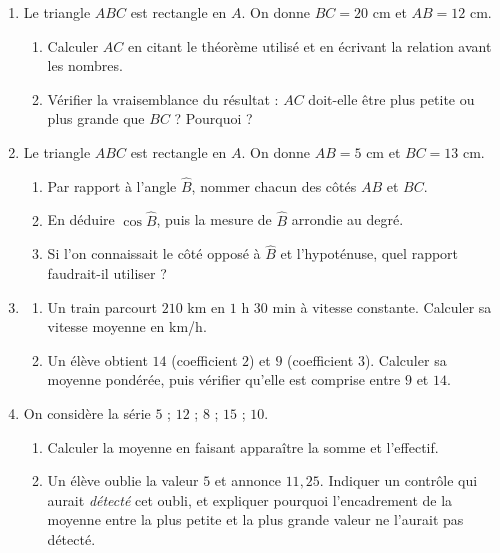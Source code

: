 \documentclass[10pt,a4paper]{article}
\begin{document}
\begin{enumerate}
\needspace{22mm}
\item[\textbf{B1.}] Le triangle $ABC$ est rectangle en $A$. On donne $BC = 20$ cm et $AB = 12$ cm.
\begin{enumerate}
\item Calculer $AC$ en citant le théorème utilisé et en écrivant la relation avant les nombres.
\item Vérifier la vraisemblance du résultat : $AC$ doit-elle être plus petite ou plus grande que $BC$ ? Pourquoi ?
\end{enumerate}
\par\vspace{1.2mm}
\needspace{22mm}
\item[\textbf{B2.}] Le triangle $ABC$ est rectangle en $A$. On donne $AB = 5$ cm et $BC = 13$ cm.
\begin{enumerate}
\item Par rapport à l'angle $\widehat{B}$, nommer chacun des côtés $AB$ et $BC$.
\item En déduire $\cos\widehat{B}$, puis la mesure de $\widehat{B}$ arrondie au degré.
\item Si l'on connaissait le côté opposé à $\widehat{B}$ et l'hypoténuse, quel rapport faudrait-il utiliser ?
\end{enumerate}
\par\vspace{1.2mm}
\needspace{22mm}
\item[\textbf{B3.}] \begin{enumerate}
\item Un train parcourt $210$ km en $1$ h $30$ min à vitesse constante. Calculer sa vitesse moyenne en km/h.
\item Un élève obtient $14$ (coefficient $2$) et $9$ (coefficient $3$). Calculer sa moyenne pondérée, puis vérifier
qu'elle est comprise entre $9$ et $14$.
\end{enumerate}
\par\vspace{1.2mm}
\needspace{22mm}
\item[\textbf{B4.}] On considère la série $5$ ; $12$ ; $8$ ; $15$ ; $10$.
\begin{enumerate}
\item Calculer la moyenne en faisant apparaître la somme et l'effectif.
\item Un élève oublie la valeur $5$ et annonce $11{,}25$. Indiquer un contrôle qui aurait \emph{détecté} cet oubli,
et expliquer pourquoi l'encadrement de la moyenne entre la plus petite et la plus grande valeur ne l'aurait pas détecté.
\end{enumerate}
\par\vspace{1.2mm}
\end{enumerate}
\end{document}
